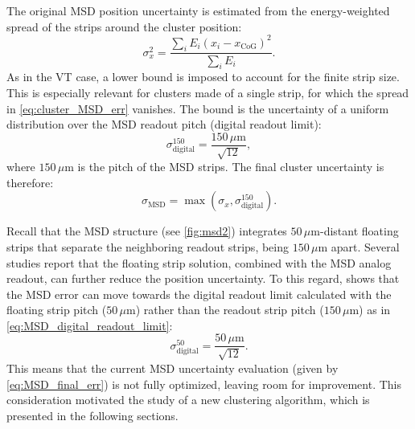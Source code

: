 The original MSD position uncertainty is estimated from the energy-weighted spread of the strips around the cluster position:
\begin{equation}
	\sigma_x^2 =
	\frac{\displaystyle\sum_i E_i
		(x_i-x_{\mathrm{CoG}})^2}
	{\displaystyle\sum_i E_i}.
	\label{eq:cluster_MSD_err}
\end{equation}
As in the VT case, a lower bound is imposed to account for the finite strip size. This is especially relevant for clusters made of a single strip, for which the spread in \autoref{eq:cluster_MSD_err} vanishes. The bound is the uncertainty of a uniform distribution over the MSD readout pitch (digital readout limit):
\begin{equation}
	\sigma^{150}_{\mathrm{digital}} =
	\frac{150\,\mu\mathrm{m}}{\sqrt{12}},
	\label{eq:MSD_digital_readout_limit}
\end{equation}
where $150\,\mu\mathrm{m}$ is the pitch of the MSD strips. The final cluster uncertainty is therefore:
\begin{equation}
	\sigma_{\mathrm{MSD}} =
	\max\left(\sigma_x,\sigma^{150}_{\mathrm{digital}}\right).
	\label{eq:MSD_final_err}
\end{equation}

Recall that the MSD structure (see \autoref{fig:msd2}) integrates $50\,\mu\mathrm{m}$-distant floating strips that separate the neighboring readout strips, being $150\,\mu\mathrm{m}$ apart. Several studies \cite{ADRIANI199776,ALPAT2010207} report that the floating strip solution, combined with the MSD analog readout, can further reduce the position uncertainty. To this regard, \cite{SILVESTRE2023167717} shows that the MSD error can move towards the digital readout limit calculated with the floating strip pitch ($50\,\mu\mathrm{m}$) rather than the readout strip pitch ($150\,\mu\mathrm{m}$) as in \autoref{eq:MSD_digital_readout_limit}:
\begin{equation}
	\sigma^{50}_{\mathrm{digital}} =
	\frac{50\,\mu\mathrm{m}}{\sqrt{12}}.
	\label{eq:MSD_digital_readout_limit_floating}
\end{equation}
This means that the current MSD uncertainty evaluation (given by \autoref{eq:MSD_final_err}) is not fully optimized, leaving room for improvement. This consideration motivated the study of a new clustering algorithm, which is presented in the following sections.
